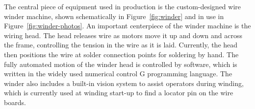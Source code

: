 \begin{comment}
A subset of procedures describing how to perform the step-by-step assembly of an \dword{apa} was originally created prior to the finalization of the \dword{pdsp} \dword{apa} series of drawings, and assigned drawing numbers. During subsequent assemblies, these instructions have evolved due to the addition of better tooling, fixtures, jigs and more complete drawing documents.  The process steps contained in each procedure have also been changed to create a better match with the B.O.M. (Bill Of Materials) contained on each finalized drawing level.  Table~\ref{tab:assembly-docs} lists what documents are available related to each assembly level.  Currently these documents are being revised to reflect the latest evolution of these procedures that were used to assemble US-\dword{apa}-4 for \dword{pdsp}.

\begin{dunetable}[\dword{apa} assembly documents]{lcc}{tab:assembly-docs}{Procedure documents for \dword{apa} assembly.}   
\dword{apa} Assembly Level & \textbf{Drawing No.} & \textbf{Assembly Instructions Doc.} \\ \toprowrule
\dword{apa} Frame Assembly & 8757 004 & 8752Doc001 \\ 
                   &          & 8752Doc002 \\ \colhline
Comb Base and Mesh & 8757 003 & 8752Doc003 \\
				   &          & 8752Doc004 \\ \colhline
Four Wire Layers   & 8757 002 & ~~~~~8752Doc005 (X) \\
                   &          & ~~~~~8752Doc006 (V) \\
                   &          & ~~~~~8752Doc007 (U) \\
                   &          & ~~~~~8752Doc008 (G) \\ \colhline
Factory \dword{apa}        & 8757 030 & 8752Doc009 \\
                   &          & 8752Doc010 \\ \colhline
Crating for Shipment & being finalized & being finalized \\
\end{dunetable}
\end{comment}

The central piece of equipment used in  production is the custom-designed wire winder machine, shown schematically in Figure~\ref{fig:winder} and in use in Figure~\ref{fig:winder-photos}.  An important centerpiece of the winder machine is the wiring head.  The head releases wire as motors move it up and down and across the frame, controlling the tension in the wire as it is laid. Currently, the head then positions the wire at solder connection points for soldering by hand. The fully automated motion of the winder head is controlled by software, which is written in the widely used numerical control G programming language.  The winder also includes a built-in vision system to assist operators during winding, which is currently used at winding start-up to find a locator pin on the wire boards.  

